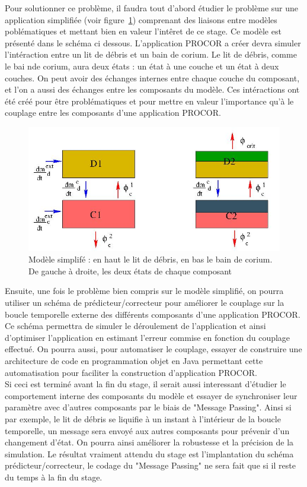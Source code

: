 Pour solutionner ce problème, il faudra tout d'abord étudier le problème sur une application simplifiée (voir figure~\ref{model}) comprenant des liaisons entre modèles poblématiques et mettant bien en valeur l'intêret de ce stage. Ce modèle est
présenté dans le schéma ci dessous. L'application PROCOR a créer devra simuler l'intéraction entre un lit de débris et un bain de corium. Le lit de débris, comme le bai nde corium, aura deux états : un état à une couche
et un état à deux couches. On peut avoir des échanges internes entre chaque couche du composant, et l'on a aussi des échanges entre les composants du modèle. Ces intéractions ont été créé pour être problématiques et pour mettre
en valeur l'importance qu'à le couplage entre les composants d'une application PROCOR. 
\begin{figure}[h]
\centering
\includegraphics[scale=0.5]{model.jpeg}
\caption{Modèle simplifé : en haut le lit de débris, en bas le bain de corium. De gauche à droite, les deux états de chaque composant}
\label{model}
\end{figure}

Ensuite, une fois le problème bien compris sur le modèle simplifié, on pourra utiliser un schéma de prédicteur/correcteur pour améliorer le couplage sur la boucle temporelle externe des différents composants d'une application
PROCOR. Ce schéma permettra de simuler le déroulement de l'application et ainsi d'optimiser l'application en estimant l'erreur commise en fonction du couplage effectué. On pourra aussi, pour automatiser le couplage, essayer
de construire une architecture de code en programmation objet en Java permettant cette automatisation pour faciliter la construction d'application PROCOR.\\ 

Si ceci est terminé avant la fin du stage, il serait aussi interessant d'étudier le comportement interne des composants du modèle et essayer de synchroniser leur paramètre avec d'autres composants par le biais de 
"Message Passing". Ainsi si par exemple, le lit de débris se liquifie à un instant à l'intérieur de la boucle temporelle, un message sera envoyé aux autres composants pour prévenir d'un changement d'état. On pourra 
ainsi améliorer la robustesse et la précision de la simulation. Le résultat vraiment attendu du stage est l'implantation du schéma prédicteur/correcteur, le codage du "Message Passing" ne sera fait que si il reste du temps
à la fin du stage.  